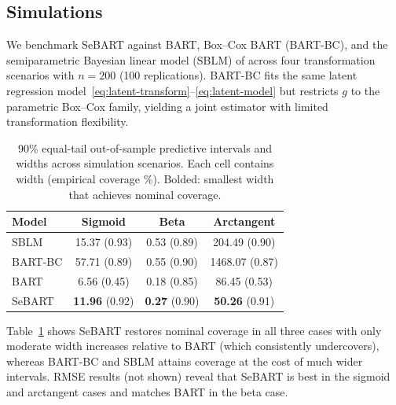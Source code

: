 \documentclass[10pt]{article}
\begin{document}
\subsection{Simulations}
We benchmark SeBART against BART, Box--Cox BART (BART-BC), and the semiparametric Bayesian linear model (SBLM) of  across four transformation scenarios with $n=200$ (100 replications). BART-BC fits the same latent regression model~\eqref{eq:latent-transform}--\eqref{eq:latent-model} but restricts $g$ to the parametric Box--Cox family, yielding a joint estimator with limited transformation flexibility.

\begin{table}[h]
\centering
\caption{90\% equal-tail out-of-sample predictive intervals and widths across simulation scenarios. Each cell contains width (empirical coverage \%). Bolded: smallest width that achieves nominal coverage.}
\label{tab:sim-intervals}
\begin{tabular}{lccc}
\toprule
Model & Sigmoid & Beta & Arctangent \\
\midrule
SBLM & 15.37 (0.93) & 0.53 (0.89) & 204.49 (0.90) \\
BART-BC & 57.71 (0.89) & 0.55 (0.90) & 1468.07 (0.87) \\
BART & 6.56 (0.45) & 0.18 (0.85) & 86.45 (0.53) \\
SeBART & \textbf{11.96} (0.92) & \textbf{0.27} (0.90) & \textbf{50.26} (0.91) \\
\bottomrule
\end{tabular}
\end{table}

Table~\ref{tab:sim-intervals} shows SeBART restores nominal coverage in all three cases with only moderate width increases relative to BART (which consistently undercovers), whereas BART-BC and SBLM attains coverage at the cost of much wider intervals. RMSE results (not shown) reveal that SeBART is best in the sigmoid and arctangent cases and matches BART in the beta case.
\end{document}
